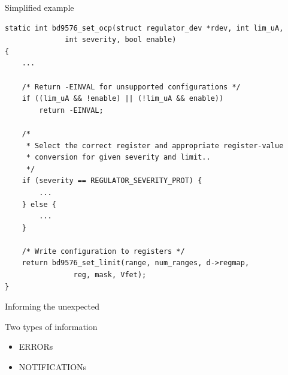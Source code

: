 \documentclass[10pt]{beamer}
\begin{document}


\begin{frame}[fragile]{Simplified example}
\lstset{language=C}
\scriptsize
\begin{lstlisting}[commentstyle=\color{orange}]
static int bd9576_set_ocp(struct regulator_dev *rdev, int lim_uA,
			  int severity, bool enable)
{
	...

	/* Return -EINVAL for unsupported configurations */
	if ((lim_uA && !enable) || (!lim_uA && enable))
		return -EINVAL;

	/*
	 * Select the correct register and appropriate register-value
	 * conversion for given severity and limit..
	 */
	if (severity == REGULATOR_SEVERITY_PROT) {
		...
	} else {
		...
	}

	/* Write configuration to registers */
	return bd9576_set_limit(range, num_ranges, d->regmap,
				reg, mask, Vfet);
}
\end{lstlisting}
\end{frame}


\begin{frame}[t]{Informing the unexpected}\vspace{4pt}
\begin{block}{Two types of information}
\begin{itemize}
	\item ERRORs
	\item NOTIFICATIONs
\end{itemize}
\end{block}

\begin{itemize}
\end{itemize}
\end{frame}
\end{document}

